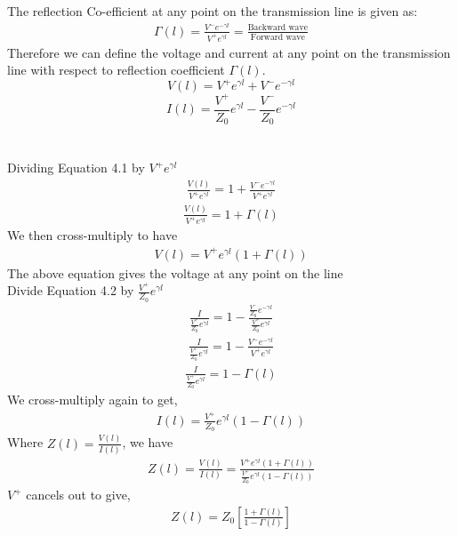 The reflection Co-efficient at any point on the transmission line is given as:
\begin{align*}
\Gamma{(l)} = \frac{V^-e^{-\gamma l}}{V^+e^{\gamma l}} = \frac{\text{Backward wave}}{\text{Forward wave}}
\end{align*}
Therefore we can define the voltage and current at any point on the transmission line with respect to reflection coefficient $\Gamma(l)$.
\begin{equation}
V(l) = V^+e^{\gamma l} + V^-e^{-\gamma l}
\end{equation}
\begin{equation}
I(l) =\frac{V^+}{Z_0} e^{\gamma l} - \frac{V^-}{Z_0}e^{-\gamma l}
\end{equation}\\\\
Dividing Equation 4.1 by $V^+e^{\gamma l}$
\begin{align*}
\frac{V(l)}{ V^+e^{\gamma l}} = 1 + \frac{ V^-e^{-\gamma l}}{ V^+e^{\gamma l}}
\end{align*}
\begin{align*}
\frac{V(l)}{ V^+e^{\gamma l}} = 1 + \Gamma(l)
\end{align*}
We then cross-multiply to have
\begin{align*}
V(l) = V^+e^{\gamma l} (1 + \Gamma(l))
\end{align*}
The above equation gives the voltage at any point on the line\\
Divide Equation 4.2 by $\frac{V^+}{Z_0} e^{\gamma l}$
\begin{align*}
\frac{I}{\frac{V^+}{Z_0} e^{\gamma l}} = 1 - \frac{\frac{V^-}{Z_0} e^{-\gamma l}}{\frac{V^+}{Z_0} e^{\gamma l}}
\end{align*}
\begin{align*}
\frac{I}{\frac{V^+}{Z_0} e^{\gamma l}}= 1 - \frac{V^-e^{-\gamma l}}{V^+e^{\gamma l}}
\end{align*}
\begin{align*}
\frac{I}{\frac{V^+}{Z_0} e^{\gamma l}} = 1 - \Gamma(l)
\end{align*}
We cross-multiply again to get,
\begin{align*}
I(l) = \frac{V^+}{Z_0} e^{\gamma l} (1 - \Gamma(l))
\end{align*}
Where $Z(l) = \frac{V(l)}{I(l)}$, we have
\begin{align*}
Z(l) = \frac{V(l)}{I(l)} = \frac{V^+e^{\gamma l} (1 + \Gamma(l))}{ \frac{V^+}{Z_0} e^{\gamma l} (1 - \Gamma(l))}
\end{align*}
$V^+$ cancels out to give,
\begin{align}
Z(l) = Z_0[\frac{1 + \Gamma(l)}{1 - \Gamma(l)}]
\end{align}

